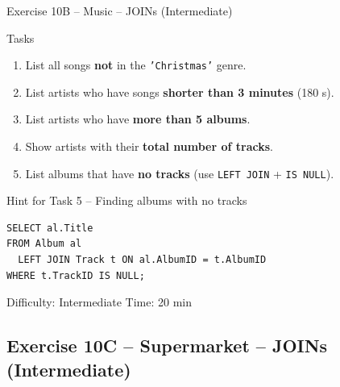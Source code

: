 \documentclass[10pt]{beamer}
\begin{document}
\begin{frame}[fragile]{Exercise 10B -- Music -- JOINs (Intermediate)}
  \begin{block}{Tasks}
    \begin{enumerate}
      \item List all songs \textbf{not} in the \texttt{'Christmas'} genre.
      \item List artists who have songs \textbf{shorter than 3 minutes} (180 s).
      \item List artists who have \textbf{more than 5 albums}.
      \item Show artists with their \textbf{total number of tracks}.
      \item List albums that have \textbf{no tracks} (use \texttt{LEFT JOIN} + \texttt{IS NULL}).
    \end{enumerate}
  \end{block}

  \begin{block}{Hint for Task 5 -- Finding albums with no tracks}
\begin{lstlisting}[style=sqlstyle]
SELECT al.Title
FROM Album al
  LEFT JOIN Track t ON al.AlbumID = t.AlbumID
WHERE t.TrackID IS NULL;
\end{lstlisting}
  \end{block}

  \begin{alertblock}{Difficulty: Intermediate \quad Time: 20 min}
  \end{alertblock}
\end{frame}

\subsection{Exercise 10C -- Supermarket -- JOINs (Intermediate)}
\end{document}
